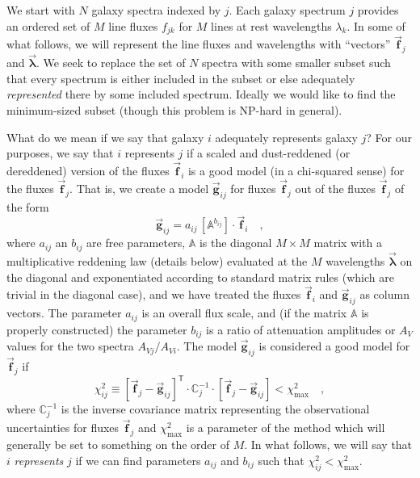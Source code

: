 \documentclass[12pt,letterpaper]{article}
\newcommand{\aij}{a_{ij}}
\newcommand{\bij}{b_{ij}}
\newcommand{\chisqij}{\chi^2_{ij}}
\newcommand{\chisqmax}{\chi^2_{\mathrm{max}}}
\newcommand{\datavec}[1]{\vec{\boldsymbol{#1}}}
\newcommand{\vlambda}{\datavec{\lambda}}
\newcommand{\vfi}{\datavec{f}_{\!i}}
\newcommand{\vfj}{\datavec{f}_{\!j}}
\newcommand{\vfmodelij}{\datavec{g}_{ij}}
\newcommand{\datamatrix}[1]{\mathbb{#1}}
\newcommand{\reddening}{\datamatrix{A}}
\newcommand{\invcovarj}{\datamatrix{C}^{-1}_{j}}
\newcommand{\transpose}{^{\!\textsf{T}}}
\begin{document}
We start with $N$ galaxy spectra indexed by $j$.  Each galaxy spectrum
$j$ provides an ordered set of $M$ line fluxes $f_{jk}$ for $M$ lines
at rest wavelengths $\lambda_k$.  In some of what follows, we will
represent the line fluxes and wavelengths with ``vectors'' $\vfj$ and
$\vlambda$.  We seek to replace the set of $N$ spectra with some
smaller subset such that every spectrum is either included in the
subset or else adequately \emph{represented} there by some included
spectrum.  Ideally we would like to find the minimum-sized subset
(though this problem is NP-hard in general).

What do we mean if we say that galaxy $i$ adequately represents galaxy
$j$?  For our purposes, we say that $i$ represents $j$ if a scaled and
dust-reddened (or dereddened) version of the fluxes $\vfi$ is a good
model (in a chi-squared sense) for the fluxes $\vfj$.  That is, we
create a model $\vfmodelij$ for fluxes $\vfj$ out of the fluxes $\vfj$
of the form
\begin{equation}
\vfmodelij= \aij\,\left[\reddening^{\bij}\right]\cdot\vfi
\quad,
\end{equation}
where $\aij$ an $\bij$ are free parameters, $\reddening$ is the
diagonal $M\times M$ matrix with a multiplicative reddening law
(details below) evaluated at the $M$ wavelengths $\vlambda$ on the
diagonal and exponentiated according to standard matrix rules (which
are trivial in the diagonal case), and we have treated the fluxes
$\vfi$ and $\vfmodelij$ as column vectors.  The parameter $\aij$ is an
overall flux scale, and (if the matrix $\reddening$ is properly
constructed) the parameter $\bij$ is a ratio of attenuation amplitudes
or $A_V$ values for the two spectra $A_{Vj}/A_{Vi}$.  The model
$\vfmodelij$ is considered a good model for $\vfj$ if
\begin{equation}
\chisqij\equiv \left[\vfj-\vfmodelij\right]\transpose
  \cdot\invcovarj
  \cdot\left[\vfj-\vfmodelij\right] < \chisqmax
\quad,
\end{equation}
where $\invcovarj$ is the inverse covariance matrix representing the
observational uncertainties for fluxes $\vfj$ and $\chisqmax$ is a
parameter of the method which will generally be set to something on
the order of $M$.  In what follows, we will say that $i$
\emph{represents} $j$ if we can find parameters $\aij$ and $\bij$ such
that $\chisqij < \chisqmax$.
\end{document}
